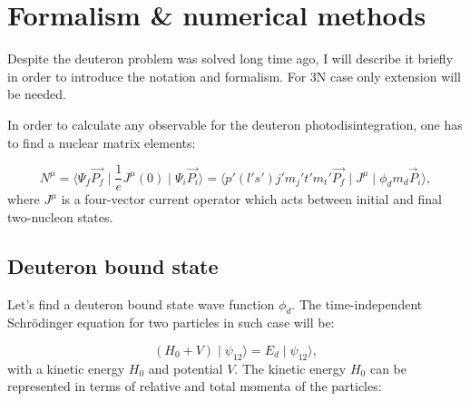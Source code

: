 \chapter{Formalism \& numerical methods}

Despite the deuteron problem was solved long time ago, I will describe it briefly 
in order to introduce the notation and formalism. For 3N case only 
extension will be needed.

In order to calculate any observable for the deuteron photodisintegration,
one has to find a nuclear matrix elements:

\begin{equation}
    N^\mu = \langle \Psi_f \vec{P_f} \mid \frac{1}{e}J^\mu(0) \mid \Psi_i \vec{P_i} \rangle =
    \langle p' (l's')j'm_j't'm_t' \vec{P_f} \mid J^\mu \mid \phi_d m_d \vec{P}_i \rangle, 
    \label{main}
\end{equation}
where $J^\mu$ is a four-vector current operator which acts between initial and final 
two-nucleon states. 



\section{Deuteron bound state}
    \label{sec:deut_bound}

    Let's find a deuteron bound state wave function $\phi_d$. The time-independent Schr\"{o}dinger
    equation for two particles in such case will be:

    \begin{equation}
        (H_0 + V) \mid \psi_{12} \rangle  = E_d \mid \psi_{12} \rangle,
        \label{shrod_bound}
    \end{equation}
    with a kinetic energy $H_0$ and potential $V$. 
    The kinetic energy $H_0$ can be represented in terms of  relative and total momenta
    of the particles:

